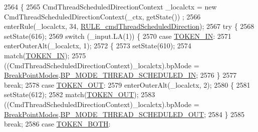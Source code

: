 \begin{DoxyCode}
2564                                                                                                            
       \{
2565     CmdThreadScheduledDirectionContext \_localctx = \textcolor{keyword}{new} CmdThreadScheduledDirectionContext(\_ctx, getState())
      ;
2566     enterRule(\_localctx, 34, \hyperlink{classgov_1_1nasa_1_1jpf_1_1inspector_1_1server_1_1expression_1_1parser_1_1_expression_grammar_parser_a66e47277c64d0382e31cfcc7f95a6c8a}{RULE\_cmdThreadScheduledDirection});
2567     \textcolor{keywordflow}{try} \{
2568       setState(616);
2569       \textcolor{keywordflow}{switch} (\_input.LA(1)) \{
2570       \textcolor{keywordflow}{case} \hyperlink{classgov_1_1nasa_1_1jpf_1_1inspector_1_1server_1_1expression_1_1parser_1_1_expression_grammar_parser_a0a9684b3c87e1c8969c41af0f6d432c8}{TOKEN\_IN}:
2571         enterOuterAlt(\_localctx, 1);
2572         \{
2573         setState(610);
2574         match(\hyperlink{classgov_1_1nasa_1_1jpf_1_1inspector_1_1server_1_1expression_1_1parser_1_1_expression_grammar_parser_a0a9684b3c87e1c8969c41af0f6d432c8}{TOKEN\_IN});
2575          ((CmdThreadScheduledDirectionContext)\_localctx).bpMode =  
      \hyperlink{enumgov_1_1nasa_1_1jpf_1_1inspector_1_1server_1_1breakpoints_1_1_break_point_modes}{BreakPointModes}.\hyperlink{enumgov_1_1nasa_1_1jpf_1_1inspector_1_1server_1_1breakpoints_1_1_break_point_modes_a3092604dadf48fb7ebceb8f285ad3b96}{BP\_MODE\_THREAD\_SCHEDULED\_IN}; 
2576         \}
2577         \textcolor{keywordflow}{break};
2578       \textcolor{keywordflow}{case} \hyperlink{classgov_1_1nasa_1_1jpf_1_1inspector_1_1server_1_1expression_1_1parser_1_1_expression_grammar_parser_a8d288905d032cc63fc0d9bb8db2634c4}{TOKEN\_OUT}:
2579         enterOuterAlt(\_localctx, 2);
2580         \{
2581         setState(612);
2582         match(\hyperlink{classgov_1_1nasa_1_1jpf_1_1inspector_1_1server_1_1expression_1_1parser_1_1_expression_grammar_parser_a8d288905d032cc63fc0d9bb8db2634c4}{TOKEN\_OUT});
2583          ((CmdThreadScheduledDirectionContext)\_localctx).bpMode =  
      \hyperlink{enumgov_1_1nasa_1_1jpf_1_1inspector_1_1server_1_1breakpoints_1_1_break_point_modes}{BreakPointModes}.\hyperlink{enumgov_1_1nasa_1_1jpf_1_1inspector_1_1server_1_1breakpoints_1_1_break_point_modes_a4e3f6dfc4adda114b696bf86f0be1ae2}{BP\_MODE\_THREAD\_SCHEDULED\_OUT}; 
2584         \}
2585         \textcolor{keywordflow}{break};
2586       \textcolor{keywordflow}{case} \hyperlink{classgov_1_1nasa_1_1jpf_1_1inspector_1_1server_1_1expression_1_1parser_1_1_expression_grammar_parser_adb1cf23ee91ded4bcbbba7860c7e27ff}{TOKEN\_BOTH}:

\end{DoxyCode}
